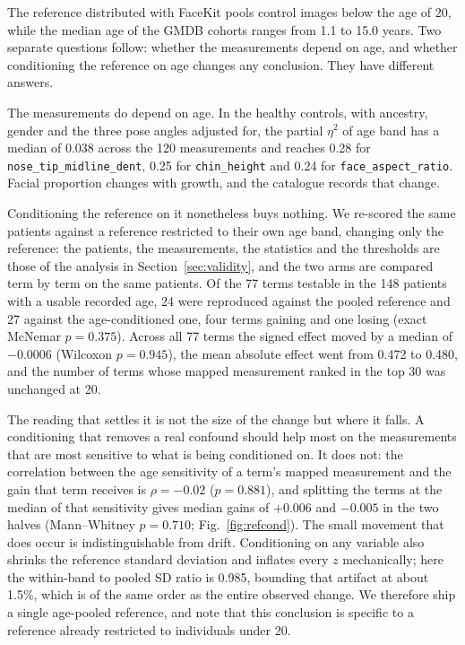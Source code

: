 \documentclass[11pt]{article}
\begin{document}
The reference distributed with FaceKit pools control images below the age of
20, while the median age of the GMDB cohorts ranges from 1.1 to 15.0 years. Two
separate questions follow: whether the measurements depend on age, and whether
conditioning the reference on age changes any conclusion. They have different
answers.

The measurements do depend on age. In the healthy controls, with ancestry,
gender and the three pose angles adjusted for, the partial $\eta^2$ of age band
has a median of 0.038 across the 120 measurements and reaches 0.28 for
\texttt{nose\_tip\_midline\_dent}, 0.25 for \texttt{chin\_height} and 0.24 for
\texttt{face\_aspect\_ratio}. Facial proportion changes with growth, and the
catalogue records that change.

Conditioning the reference on it nonetheless buys nothing. We re-scored the
same patients against a reference restricted to their own age band, changing
only the reference: the patients, the measurements, the statistics and the
thresholds are those of the analysis in Section~\ref{sec:validity}, and the two
arms are compared term by term on the same patients. Of the 77 terms testable
in the 148 patients with a usable recorded age, 24 were reproduced against the
pooled reference and 27 against the age-conditioned one, four terms gaining and
one losing (exact McNemar $p = 0.375$). Across all 77 terms the signed effect
moved by a median of $-0.0006$ (Wilcoxon $p = 0.945$), the mean absolute effect
went from 0.472 to 0.480, and the number of terms whose mapped measurement
ranked in the top 30 was unchanged at 20.

The reading that settles it is not the size of the change but where it falls. A
conditioning that removes a real confound should help most on the measurements
that are most sensitive to what is being conditioned on. It does not: the
correlation between the age sensitivity of a term's mapped measurement and the
gain that term receives is $\rho = -0.02$ ($p = 0.881$), and splitting the terms
at the median of that sensitivity gives median gains of $+0.006$ and $-0.005$ in
the two halves (Mann--Whitney $p = 0.710$; Fig.~\ref{fig:refcond}).
The small movement that does occur is indistinguishable from drift. Conditioning on any variable also shrinks the
reference standard deviation and inflates every $z$ mechanically; here the
within-band to pooled SD ratio is 0.985, bounding that artifact at about 1.5\%,
which is of the same order as the entire observed change. We therefore ship a
single age-pooled reference, and note that this conclusion is specific to a
reference already restricted to individuals under 20.
\end{document}
